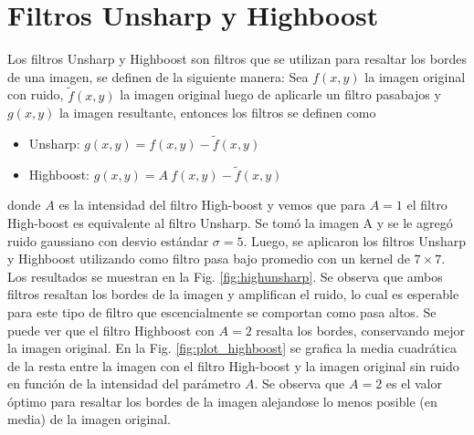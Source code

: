 \documentclass[11pt,twocolumn,twoside]{opticajnl}
\begin{document}
\section{Filtros Unsharp y Highboost\label{sec:ej6}}

\vspace{0.3cm}

Los filtros Unsharp y Highboost son filtros que se utilizan para resaltar los bordes de una imagen, se definen de la siguiente manera: Sea $f(x,y)$ la imagen original con ruido, $\tilde{f}(x,y)$ la imagen original luego de aplicarle un filtro pasabajos y $g(x,y)$ la imagen resultante, entonces los filtros se definen como
\begin{itemize}
    \item Unsharp: $g(x,y) = f(x,y) - \tilde{f}(x,y)$
    \item Highboost: $g(x,y) = A~f(x,y) - \tilde{f}(x,y)$
\end{itemize}
donde $A$ es la intensidad del filtro High-boost y vemos que para $A=1$ el filtro High-boost es equivalente al filtro Unsharp. Se tomó la imagen A y se le agregó ruido gaussiano con desvio estándar $\sigma = 5$. Luego, se aplicaron los filtros Unsharp y Highboost utilizando como filtro pasa bajo promedio con un kernel de $7\times7$. Los resultados se muestran en la Fig. \ref{fig:highunsharp}. Se observa que ambos filtros resaltan los bordes de la imagen y amplifican el ruido, lo cual es esperable para este tipo de filtro que escencialmente se comportan como pasa altos. Se puede ver que el filtro Highboost con $A=2$ resalta los bordes, conservando mejor la imagen original. En la Fig. \ref{fig:plot_highboost} se grafica la media cuadrática de la resta entre la imagen con el filtro High-boost y la imagen original sin ruido en función de la intensidad del parámetro $A$. Se observa que $A=2$ es el valor óptimo para resaltar los bordes de la imagen alejandose lo menos posible (en media) de la imagen original.
\end{document}
